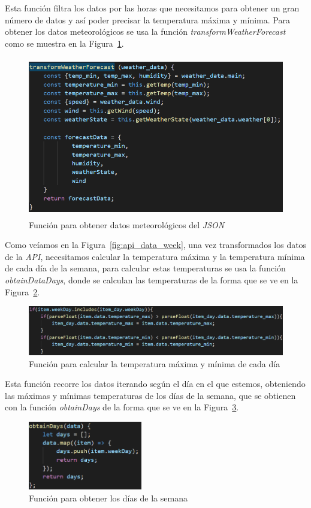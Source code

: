 \documentclass[a4paper, 12pt]{book}
\begin{document}
Esta función filtra los datos por las horas que necesitamos para obtener un gran número de datos y así poder precisar la temperatura máxima y mínima. Para obtener los datos meteorológicos se usa la función \textit{transformWeatherForecast} como se muestra en la Figura~\ref{fig:transform_data_week}.
\begin{figure}[h]
  \centering
  \includegraphics[width=12cm, height=7cm]{img_usadas/transform_data_week.png}
  \caption{Función para obtener datos meteorológicos del \textit{JSON}}
  \label{fig:transform_data_week}
\end{figure}

\vspace{5mm}
Como veíamos en la Figura~\ref{fig:api_data_week}, una vez transformados los datos de la \textit{API}, necesitamos calcular la temperatura máxima y la temperatura mínima de cada día de la semana, para calcular estas temperaturas se usa la función \textit{obtainDataDays}, donde se calculan las temperaturas de la forma que se ve en la Figura~\ref{fig:obtain_temp_max_min}.
\begin{figure}[h]
  \centering
  \includegraphics[width=15cm]{img_usadas/obtain_temp_max_min.png}
  \caption{Función para calcular la temperatura máxima y mínima de cada día}
  \label{fig:obtain_temp_max_min}
\end{figure}

Esta función recorre los datos iterando según el día en el que estemos, obteniendo las máximas y mínimas temperaturas de los días de la semana, que se obtienen con la función \textit{obtainDays} de la forma que se ve en la Figura~\ref{fig:obtain_days_week}.
\begin{figure}[h]
  \centering
  \includegraphics[height=3cm]{img_usadas/obtain_days_week.png}
  \caption{Función para obtener los días de la semana}
  \label{fig:obtain_days_week}
\end{figure}
\end{document}

